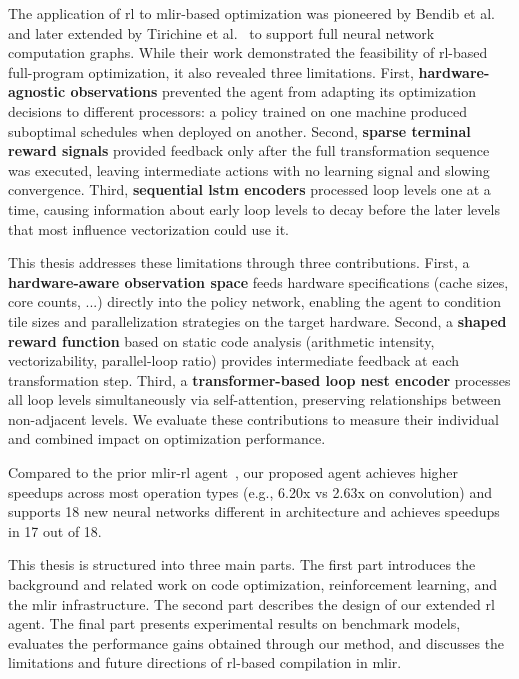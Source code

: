 The application of \gls{rl} to \gls{mlir}-based optimization was pioneered by Bendib et al.~\cite{bendib2024reinforcement} and later extended by Tirichine et al.~\cite{tirichine2025reinforcement} to support full neural network computation graphs. While their work demonstrated the feasibility of \gls{rl}-based full-program optimization, it also revealed three limitations. First, \textbf{hardware-agnostic observations} prevented the agent from adapting its optimization decisions to different processors: a policy trained on one machine produced suboptimal schedules when deployed on another. Second, \textbf{sparse terminal reward signals} provided feedback only after the full transformation sequence was executed, leaving intermediate actions with no learning signal and slowing convergence. Third, \textbf{sequential \gls{lstm} encoders} processed loop levels one at a time, causing information about early loop levels to decay before the later levels that most influence vectorization could use it.

This thesis addresses these limitations through three contributions. First, a \textbf{hardware-aware observation space} feeds hardware specifications (cache sizes, core counts, ...) directly into the policy network, enabling the agent to condition tile sizes and parallelization strategies on the target hardware. Second, a \textbf{shaped reward function} based on static code analysis (arithmetic intensity, vectorizability, parallel-loop ratio) provides intermediate feedback at each transformation step. Third, a \textbf{transformer-based loop nest encoder} processes all loop levels simultaneously via self-attention, preserving relationships between non-adjacent levels. We evaluate these contributions to measure their individual and combined impact on optimization performance.

Compared to the prior \gls{mlir}-\gls{rl} agent~\cite{tirichine2025reinforcement}, our proposed agent achieves higher speedups across most operation types (e.g., 6.20x vs 2.63x on convolution) and supports 18 new neural networks different in architecture and achieves speedups in 17 out of 18.

This thesis is structured into three main parts. The first part introduces the background and related work on code optimization, reinforcement learning, and the \gls{mlir} infrastructure. The second part describes the design of our extended \gls{rl} agent. The final part presents experimental results on benchmark models, evaluates the performance gains obtained through our method, and discusses the limitations and future directions of \gls{rl}-based compilation in \gls{mlir}.
